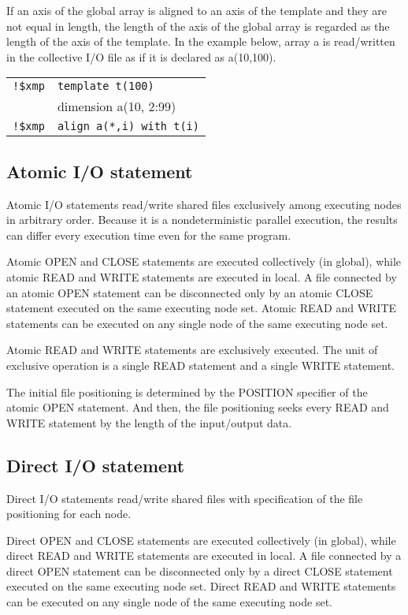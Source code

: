    If an axis of the global array is aligned to an axis of the template and they are not equal in length, the length of the axis of the global array is regarded as the length of the axis of the template. In the example below, array a is read/written in the collective I/O file as if it is declared as a(10,100).\\
   \begin{tabular}{ll}
     \verb|!$xmp| & \verb|template t(100)| \\
     & dimension a(10, 2:99) \\
     \verb|!$xmp| & \verb|align a(*,i) with t(i)| \\
   \end{tabular}
\fi
   
   \subsection{Atomic I/O statement}

   Atomic I/O statements read/write shared files exclusively among executing nodes
   in arbitrary order.
   Because it is a nondeterministic parallel execution,
   the results can differ every execution time even for the same program.

   Atomic OPEN and CLOSE statements are executed collectively (in global), while atomic
   READ and WRITE statements are executed in local.
   A file connected by an atomic OPEN statement can be disconnected only by an
   atomic CLOSE statement executed on the same executing node set.
   Atomic READ and WRITE statements can be executed on any single node of the
   same executing node set.

   Atomic READ and WRITE statements are exclusively executed.
   The unit of exclusive operation is a single READ statement and a single WRITE
   statement.

   The initial file positioning is determined by the POSITION specifier of
   the atomic OPEN statement.
   And then, the file positioning seeks every READ and WRITE statement 
   by the length of the input/output data.


   \subsection{Direct I/O statement}

   Direct I/O statements read/write shared files with specification of the
   file positioning for each node.

   Direct OPEN and CLOSE statements are executed collectively (in global), while direct
   READ and WRITE statements are executed in local.
   A file connected by a direct OPEN statement can be disconnected only by a
   direct CLOSE statement executed on the same executing node set.
   Direct READ and WRITE statements can be executed on any single node of the
   same executing node set.
   
